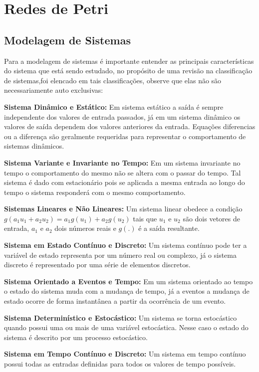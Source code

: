 \chapter{Redes de Petri}
\label{chap:petri}

\section{Modelagem de Sistemas}
Para a modelagem de sistemas é importante entender as principais características do sistema que está sendo estudado, no propósito de uma revisão na classificação de sistemas,foi elencado em \cite{cassandras} tais classificações, observe que elas não são necessariamente auto exclusivas: 

\textbf{Sistema Dinâmico e Estático:}  Em sistema estático a saída é sempre independente dos valores de entrada passados, já em um sistema dinâmico os valores de saída dependem dos valores anteriores da entrada. Equações diferencias ou a diferença são geralmente requeridas para representar o comportamento de sistemas dinâmicos.

\textbf{Sistema Variante e Invariante no Tempo:} Em um sistema invariante no tempo o comportamento do mesmo não se altera com o passar do tempo. Tal sistema é dado com estacionário pois se aplicada a mesma entrada ao longo do tempo o sistema responderá com o mesmo comportamento.

\textbf{Sistemas Lineares e Não Lineares: } Um sistema linear obedece a condição $g(a_1u_1 + a_2u_2) = a_1g(u_1) + a_2g(u_2)$ tais que $u_1$ e $u_2$ são dois vetores de entrada, $a_1$ e $a_2$ dois números reais e $g(.)$ é a saída resultante. 

\textbf{Sistema em Estado Contínuo e Discreto: } Um sistema contínuo pode ter a variável de estado representa por um número real ou complexo, já o sistema discreto é representado por uma série de elementos discretos.

\textbf{Sistema Orientado a Eventos e Tempo: } Em um sistema orientado ao tempo o estado do sistema muda com a mudança de tempo, já a eventos a mudança de estado ocorre de forma instantânea a partir da ocorrência de um evento.

\textbf{Sistema Determinístico e Estocástico: } Um sistema se torna estocástico quando possui uma ou mais de uma variável estocástica. Nesse caso o estado do sistema é descrito por um processo estocástico.

\textbf{Sistema em Tempo Contínuo e Discreto: } Um sistema em tempo contínuo possui todas as entradas definidas para todos os valores de tempo possíveis. 

